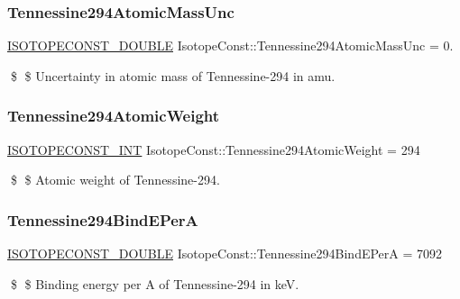 \subsubsection{\texorpdfstring{Tennessine294\+Atomic\+Mass\+Unc}{Tennessine294AtomicMassUnc}}
{\footnotesize\ttfamily \mbox{\hyperlink{group___isotope_const-_macros_ga8f45a7272ce02c0b4c65c44636ed719a}{I\+S\+O\+T\+O\+P\+E\+C\+O\+N\+S\+T\+\_\+\+D\+O\+U\+B\+LE}} Isotope\+Const\+::\+Tennessine294\+Atomic\+Mass\+Unc = 0.}

\$ \$ Uncertainty in atomic mass of Tennessine-\/294 in amu. \mbox{\label{group___isotope_const-_tennessine-_ts294_ga11f9832a76623ebcd3ab01a4a1185990}} 
\subsubsection{\texorpdfstring{Tennessine294\+Atomic\+Weight}{Tennessine294AtomicWeight}}
{\footnotesize\ttfamily \mbox{\hyperlink{group___isotope_const-_macros_ga5f18360b3e99483a35c32d789e62621c}{I\+S\+O\+T\+O\+P\+E\+C\+O\+N\+S\+T\+\_\+\+I\+NT}} Isotope\+Const\+::\+Tennessine294\+Atomic\+Weight = 294}

\$ \$ Atomic weight of Tennessine-\/294. \mbox{\label{group___isotope_const-_tennessine-_ts294_ga1995aa8e7bea688523538ef04b5084ab}} 
\subsubsection{\texorpdfstring{Tennessine294\+Bind\+E\+PerA}{Tennessine294BindEPerA}}
{\footnotesize\ttfamily \mbox{\hyperlink{group___isotope_const-_macros_ga8f45a7272ce02c0b4c65c44636ed719a}{I\+S\+O\+T\+O\+P\+E\+C\+O\+N\+S\+T\+\_\+\+D\+O\+U\+B\+LE}} Isotope\+Const\+::\+Tennessine294\+Bind\+E\+PerA = 7092}

\$ \$ Binding energy per A of Tennessine-\/294 in keV. \mbox{\label{group___isotope_const-_tennessine-_ts294_ga9874376a8c587d1a5e568c5a4edce0bd}} 
